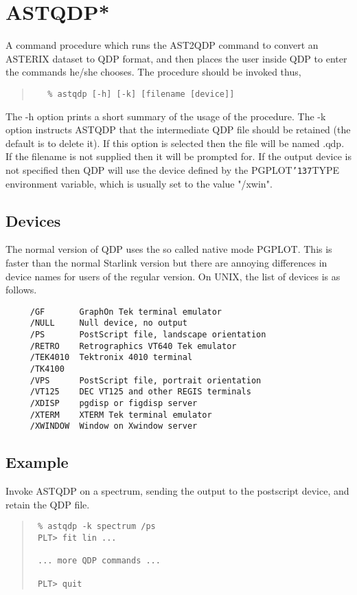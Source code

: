 \documentclass{book}
\renewcommand{\_}{{\tt\char'137}}     %
\begin{document}
\section{ASTQDP*}
A command procedure which runs the AST2QDP command to convert
an ASTERIX dataset to QDP format, and then places the user inside
QDP to enter the commands he/she chooses. The procedure should be
invoked thus,
 
\begin{quote}\begin{verbatim}
   % astqdp [-h] [-k] [filename [device]]
\end{verbatim}\end{quote}
The -h option prints a short summary of the usage of the procedure.
The -k option instructs ASTQDP that the intermediate QDP file
should be retained (the default is to delete it). If this option
is selected then the file will be named .qdp. If the
filename is not supplied then it will be prompted for. If the
output device is not specified then QDP will use the device defined
by the PGPLOT\_TYPE environment variable, which is usually set to
the value "/xwin".
 
\subsection{Devices}
The normal version of QDP uses the so called native mode PGPLOT.
This is faster than the normal Starlink version but there are
annoying differences in device names for users of the regular
version. On UNIX, the list of devices is as follows.
\begin{verbatim}
     /GF       GraphOn Tek terminal emulator
     /NULL     Null device, no output
     /PS       PostScript file, landscape orientation
     /RETRO    Retrographics VT640 Tek emulator
     /TEK4010  Tektronix 4010 terminal
     /TK4100
     /VPS      PostScript file, portrait orientation
     /VT125    DEC VT125 and other REGIS terminals
     /XDISP    pgdisp or figdisp server
     /XTERM    XTERM Tek terminal emulator
     /XWINDOW  Window on Xwindow server
\end{verbatim}
\subsection{Example}
Invoke ASTQDP on a spectrum, sending the output to the postscript
device, and retain the QDP file.
 
\begin{quote}\begin{verbatim}
 % astqdp -k spectrum /ps
 PLT> fit lin ...
 
 ... more QDP commands ...
 
 PLT> quit
\end{verbatim}\end{quote}
\end{document}
